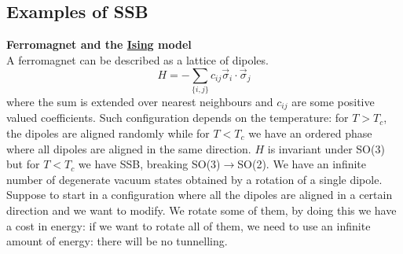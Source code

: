 \documentclass[../main.tex]{subfiles}
\begin{document}
\subsection{Examples of SSB}
\begin{example}
\textbf{Ferromagnet and the \href{https://en.wikipedia.org/wiki/Ernst_Ising}{Ising} model}\\
A ferromagnet can be described as a lattice of dipoles.
\[
H=-\sum_{\{i,j\}}c_{ij}\Vec{\sigma}_i\cdot\Vec{\sigma}_j
\]
where the sum is extended over nearest neighbours and $c_{ij}$ are some positive valued coefficients. Such configuration depends on the temperature: for $T>T_c$, the dipoles are aligned randomly while for $T<T_c$ we have an ordered phase where all dipoles are aligned in the same direction. $H$ is invariant under SO(3) but for $T<T_c$ we have SSB, breaking SO(3)$\to$SO(2). We have an infinite number of degenerate vacuum states obtained by a rotation of a single dipole. Suppose to start in a configuration where all the dipoles are aligned in a certain direction and we want to modify. We rotate some of them, by doing this we have a cost in energy: if we want to rotate all of them, we need to use an infinite amount of energy: there will be no tunnelling.
\end{example}
\end{document}

